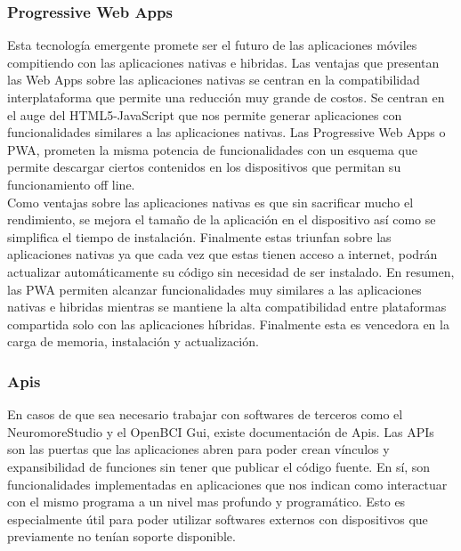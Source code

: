 \subsubsection{Progressive Web Apps}
\label{sec:orgdd8b1c9}
Esta tecnología emergente promete ser el futuro de las aplicaciones móviles compitiendo con las aplicaciones nativas e hibridas. Las ventajas que presentan las Web Apps sobre las aplicaciones nativas se centran en la compatibilidad interplataforma que permite una reducción muy grande de costos. Se centran en el auge del HTML5-JavaScript que nos permite generar aplicaciones con funcionalidades similares a las aplicaciones nativas. Las Progressive Web Apps o PWA, prometen la misma potencia de funcionalidades con un esquema que permite descargar ciertos contenidos en los dispositivos que permitan su funcionamiento off line.\\

Como ventajas sobre las aplicaciones nativas es que sin sacrificar mucho el rendimiento, se mejora el tamaño de la aplicación en el dispositivo así como se simplifica el tiempo de instalación. Finalmente estas triunfan sobre las aplicaciones nativas ya que cada vez que estas tienen acceso a internet, podrán actualizar automáticamente su código sin necesidad de ser instalado. En resumen, las PWA permiten alcanzar funcionalidades muy similares a las aplicaciones nativas e hibridas mientras se mantiene la alta compatibilidad entre plataformas compartida solo con las aplicaciones híbridas. Finalmente esta es vencedora en la carga de memoria, instalación y actualización.\\

\subsubsection{Apis}
\label{sec:orgc21cebb}
En casos de que sea necesario trabajar con softwares de terceros como el NeuromoreStudio y el OpenBCI Gui, existe documentación de Apis. Las APIs son las puertas que las aplicaciones abren para poder crean vínculos y expansibilidad de funciones sin tener que publicar el código fuente. En sí, son funcionalidades implementadas en aplicaciones que nos indican como interactuar con el mismo programa a un nivel mas profundo y programático. Esto es especialmente útil para poder utilizar softwares externos con dispositivos que previamente no tenían soporte disponible.\\

